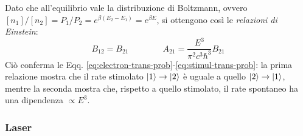 Dato che all'equilibrio vale la distribuzione di Boltzmann, ovvero $ [n_1] / [n_2] = P_1 / P_2 = e^{\beta (E_2 - E_1)} = e^{\beta E} $, si ottengono così le \textit{relazioni di Einstein}:
\begin{equation}
	B_{12} = B_{21}
	\qquad \qquad
	A_{21} = \frac{E^3}{\pi^2 c^3 \hbar^3} B_{21}
\end{equation}
Ciò conferma le Eqq. \ref{eq:electron-trans-prob}-\ref{eq:stimul-trans-prob}: la prima relazione mostra che il rate stimolato $ \ket{1} \rightarrow \ket{2} $ è uguale a quello $ \ket{2} \rightarrow \ket{1} $, mentre la seconda mostra che, rispetto a quello stimolato, il rate spontaneo ha una dipendenza $ \propto E^3 $.

\subsubsection{Laser}

